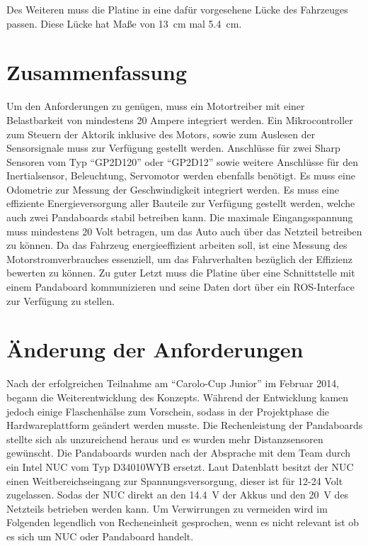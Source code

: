 Des Weiteren muss die Platine in eine dafür vorgesehene Lücke des Fahrzeuges passen. Diese Lücke hat Maße von \SI{13}{\cm} mal \SI{5,4}{\cm}.


\section{Zusammenfassung}
Um den Anforderungen zu genügen, muss ein Motortreiber mit einer Belastbarkeit von mindestens 20 Ampere integriert werden. 
Ein Mikrocontroller zum Steuern der Aktorik inklusive des Motors, sowie zum Auslesen der Sensorsignale muss zur Verfügung gestellt werden. 
Anschlüsse für zwei Sharp Sensoren vom Typ ``GP2D120'' oder ``GP2D12'' sowie weitere Anschlüsse für den Inertialsensor, Beleuchtung, Servomotor werden ebenfalls benötigt. 
Es muss eine Odometrie zur Messung der Geschwindigkeit integriert werden.
Es muss eine effiziente Energieversorgung aller Bauteile zur Verfügung gestellt werden, welche auch zwei Pandaboards stabil betreiben kann. Die maximale Eingangsspannung
muss mindestens 20 Volt betragen, um das Auto auch über das Netzteil betreiben zu können.
Da das Fahrzeug energieeffizient arbeiten soll, ist eine Messung des Motorstromverbrauches essenziell, um das Fahrverhalten bezüglich der Effizienz bewerten zu können.
Zu guter Letzt muss die Platine über eine Schnittstelle mit einem Pandaboard kommunizieren und seine Daten dort über ein ROS-Interface zur Verfügung zu stellen.

\section{Änderung der Anforderungen}
Nach der erfolgreichen Teilnahme am ``Carolo-Cup Junior'' im Februar 2014, begann die Weiterentwicklung des Konzepts. Während der Entwicklung kamen jedoch
einige Flaschenhälse zum Vorschein, sodass in der Projektphase die Hardwareplattform geändert werden musste. Die Rechenleistung der Pandaboards stellte sich
als unzureichend heraus und es wurden mehr Distanzsensoren gewünscht. Die Pandaboards wurden nach der Absprache mit dem Team durch ein Intel NUC vom Typ
D34010WYB ersetzt. Laut Datenblatt \cite{datasheet-nuc} besitzt der NUC einen Weitbereichseingang zur Spannungsversorgung, dieser ist für 12-24 Volt zugelassen.
Sodas der NUC direkt an den \SI{14,4}{\V} der Akkus und den \SI{20}{\V} des Netzteils betrieben werden kann. Um Verwirrungen zu vermeiden wird im Folgenden legendlich 
von Recheneinheit gesprochen, wenn es nicht relevant ist ob es sich um NUC oder Pandaboard handelt.
